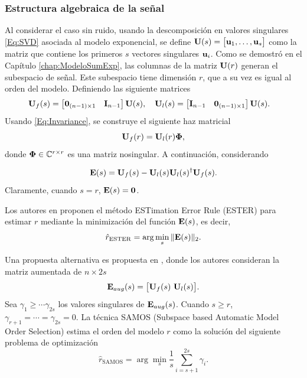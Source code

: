 \subsubsection{Estructura algebraica de la señal}

    Al considerar el caso sin ruido, usando la descomposición en valores singulares \eqref{Eq:SVD} asociada al modelo exponencial, se define $\mathbf{U}(s) = \big[\mathbf{u}_1,\ldots,\mathbf{u}_s\big]$ como la matriz que contiene los primeros $s$ vectores singulares $\mathbf{u}_i$. Como se demostró en el Capítulo \ref{chap:ModeloSumExp}, las columnas de la matriz $\mathbf{U}(r)$ generan el subespacio de señal. Este subespacio tiene dimensión $r$, que a su vez es igual al orden del modelo. Definiendo las siguiente matrices
\begin{equation}
	\begin{aligned} 
		& \mathbf{U}_f(s) = \begin{bmatrix} \mathbf{0}_{(n-1)\times 1} & \mathbf{I}_{n-1}\end{bmatrix}\mathbf{U}(s), \quad
		\mathbf{U}_l(s) = \begin{bmatrix}  \mathbf{I}_{n-1} & \mathbf{0}_{(n-1)\times 1} \end{bmatrix}\mathbf{U}(s).
	\end{aligned}
	\label{Eq:matrices_lf}
\end{equation}
Usando \eqref{Eq:Invariance}, se construye el siguiente haz matricial
\begin{equation}
	\mathbf{U}_f(r) = \mathbf{U}_l(r)\boldsymbol{\Phi},
	\label{Um:eq}
\end{equation}
donde  $\boldsymbol{\Phi} \in \mathbb{C}^{r \times r}$ es una matriz nosingular. A continuación, considerando

\begin{equation}
	\mathbf{E}(s) = \mathbf{U}_f(s) - \mathbf{U}_l(s)\mathbf{U}_l(s)^\dagger\mathbf{U}_f(s).
	\label{eq:rhatESTER}
\end{equation}
Claramente, cuando $s=r$, $\mathbf{E}(s)= \mathbf{0}$.

Los autores en \cite{Badeau2006} proponen el método ESTimation Error Rule (ESTER) para estimar $r$ mediante la minimización del función $\mathbf{E}(s)$, es decir,
\begin{equation}
	\hat{r}_{\mathrm{ESTER}} = \arg\min_s\|\mathbf{E}(s)\|_2.
	\label{Eq:ESTER_Rule}
\end{equation}

Una propuesta alternativa es propuesta en \cite{Papy2007}, donde los autores consideran la matriz aumentada de $n\times 2s$
\[ \matE_{aug}(s) = \big[\matU_f(s)\ \matU_l(s)\big].\]
Sea $\gamma_1\ge\cdots\gamma_{2s}$ los valores singulares de $\mathbf{E}_{aug}(s)$. Cuando $s\ge r$, $\gamma_{r+1} = \cdots =\gamma_{2s} = 0$. La técnica SAMOS (Subspace based Automatic Model Order Selection) estima el orden del modelo $r$ como la solución del siguiente problema de optimización
\begin{equation}
	\hat{r}_{\mathrm{SAMOS}} = \arg\min_s\frac{1}{s}\sum_{i=s+1}^{2s} \gamma_i. 
	\label{eq:rhatSAMOS}
\end{equation}

